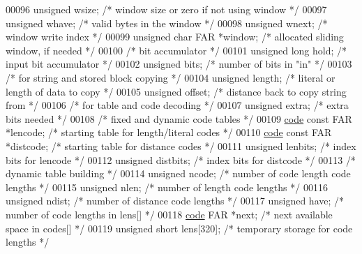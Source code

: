 \begin{DoxyCode}
00096     \textcolor{keywordtype}{unsigned} wsize;             \textcolor{comment}{/* window size or zero if not using window */}
00097     \textcolor{keywordtype}{unsigned} whave;             \textcolor{comment}{/* valid bytes in the window */}
00098     \textcolor{keywordtype}{unsigned} wnext;             \textcolor{comment}{/* window write index */}
00099     \textcolor{keywordtype}{unsigned} \textcolor{keywordtype}{char} FAR *window;  \textcolor{comment}{/* allocated sliding window, if needed */}
00100         \textcolor{comment}{/* bit accumulator */}
00101     \textcolor{keywordtype}{unsigned} \textcolor{keywordtype}{long} hold;         \textcolor{comment}{/* input bit accumulator */}
00102     \textcolor{keywordtype}{unsigned} bits;              \textcolor{comment}{/* number of bits in "in" */}
00103         \textcolor{comment}{/* for string and stored block copying */}
00104     \textcolor{keywordtype}{unsigned} length;            \textcolor{comment}{/* literal or length of data to copy */}
00105     \textcolor{keywordtype}{unsigned} offset;            \textcolor{comment}{/* distance back to copy string from */}
00106         \textcolor{comment}{/* for table and code decoding */}
00107     \textcolor{keywordtype}{unsigned} extra;             \textcolor{comment}{/* extra bits needed */}
00108         \textcolor{comment}{/* fixed and dynamic code tables */}
00109     \hyperlink{structcode}{code} \textcolor{keyword}{const} FAR *lencode;    \textcolor{comment}{/* starting table for length/literal codes */}
00110     \hyperlink{structcode}{code} \textcolor{keyword}{const} FAR *distcode;   \textcolor{comment}{/* starting table for distance codes */}
00111     \textcolor{keywordtype}{unsigned} lenbits;           \textcolor{comment}{/* index bits for lencode */}
00112     \textcolor{keywordtype}{unsigned} distbits;          \textcolor{comment}{/* index bits for distcode */}
00113         \textcolor{comment}{/* dynamic table building */}
00114     \textcolor{keywordtype}{unsigned} ncode;             \textcolor{comment}{/* number of code length code lengths */}
00115     \textcolor{keywordtype}{unsigned} nlen;              \textcolor{comment}{/* number of length code lengths */}
00116     \textcolor{keywordtype}{unsigned} ndist;             \textcolor{comment}{/* number of distance code lengths */}
00117     \textcolor{keywordtype}{unsigned} have;              \textcolor{comment}{/* number of code lengths in lens[] */}
00118     \hyperlink{structcode}{code} FAR *next;             \textcolor{comment}{/* next available space in codes[] */}
00119     \textcolor{keywordtype}{unsigned} \textcolor{keywordtype}{short} lens[320];   \textcolor{comment}{/* temporary storage for code lengths */}

\end{DoxyCode}
